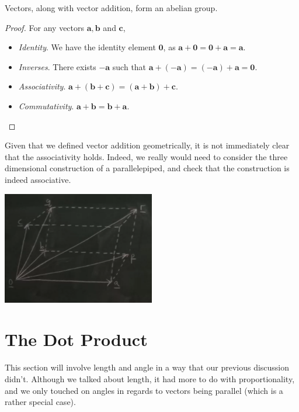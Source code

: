 \documentclass[a4]{scrreprt}
\begin{document}
\begin{theorem}
	Vectors, along with vector addition, form an abelian group.
\end{theorem}
\begin{proof}
	For any vectors $\mathbf{a}, \mathbf{b}$ and $\mathbf{c}$,\phantom{\qedhere}
	\begin{itemize}
		\item \emph{Identity}. We have the identity element $\mathbf{0}$, as $\mathbf{a} + \mathbf{0} = \mathbf{0} + \mathbf{a} = \mathbf{a}$.
		\item \emph{Inverses}. There exists $-\mathbf{a}$ such that $\mathbf{a} + (-\mathbf{a})= (-\mathbf{a}) + \mathbf{a} = \mathbf{0}$.
		\item \emph{Associativity}. $\mathbf{a} + (\mathbf{b} + \mathbf{c}) = (\mathbf{a} + \mathbf{b}) + \mathbf{c}$.
		\item \emph{Commutativity}. $\mathbf{a} + \mathbf{b} = \mathbf{b} + \mathbf{a}$. \hfill \qedsymbol
	\end{itemize}
\end{proof}

\begin{remark}
	Given that we defined vector addition geometrically, it is not immediately clear that the associativity holds. Indeed, we really would need to consider the three dimensional construction of a parallelepiped, and check that the construction is indeed associative.
	\begin{center}
		\includegraphics[width=0.5\textwidth]{parallelapiped.png}
	\end{center}
\end{remark}

\section{The Dot Product}

This section will involve length and angle in a way that our previous discussion didn't. Although we talked about length, it had more to do with proportionality, and we only touched on angles in regards to vectors being parallel (which is a rather special case).
\end{document}
